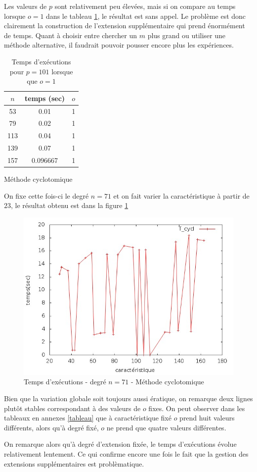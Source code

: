 \documentclass[a4paper]{article} %
\numberwithin{section}{part}
\numberwithin{equation}{section}
\begin{document}
Les valeurs de $p$ sont relativement peu élevées, mais si on compare au temps
lorsque $o = 1$ dans le tableau \ref{tab:resnumcyclsansext}, le résultat est 
sans appel. Le problème est donc clairement la construction de l'extension
supplémentaire qui prend énormément de temps. Quant à choisir entre chercher un 
$m$ plus grand ou utiliser une méthode alternative, il faudrait pouvoir pousser 
encore plus les expériences.

\begin{table}[h]
\centering
\begin{tabular}{|c|c|c|}
	\hline
	$n$ & temps (sec) & $o$\\
	\hline
	\hline
	53 & 0.01 & 1\\
	\hline
	79 & 0.02 & 1\\
	\hline
	113 & 0.04 & 1\\
	\hline
	139 & 0.07 & 1\\
	\hline
	157 & 0.096667 & 1\\
	\hline
\end{tabular}
\caption{Temps d'exécutions pour $p = 101$ lorsque que $o = 1$}
Méthode cyclotomique
\label{tab:resnumcyclsansext}
\end{table}
On fixe cette fois-ci le degré $n = 71$ et on fait varier la caractéristique à
partir de $23$, le résultat obtenu est dans la figure \ref{fig:tempscyclnfixed}
\begin{figure}[H]
\begin{center}
\includegraphics[scale=0.6]{data_test16_testcycl_fixed_degree7}
\caption{Temps d'exécutions - degré $n = 71$ - Méthode cyclotomique}
\label{fig:tempscyclnfixed}
\end{center}
\end{figure}
Bien que la variation globale soit toujours aussi ératique, on remarque deux
lignes plutôt stables correspondant à des valeurs de $o$ fixes. On peut observer
dans les tableaux en annexes \ref{tableau} que à caractéristique fixé $o$ prend
huit valeurs différents, alors qu'à degré fixé, $o$ ne prend que quatre valeurs
différentes.\par
On remarque alors qu'à degré d'extension fixée, le temps d'exécutions évolue
relativement lentement. Ce qui confirme encore une fois le fait que
la gestion des extensions supplémentaires est problèmatique.
\end{document}
